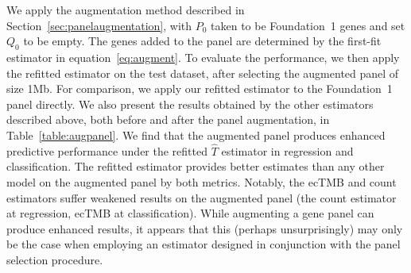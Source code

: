 \documentclass[10pt,twoside,openright]{report}
\begin{document}
We apply the augmentation method described in Section~\ref{sec:panelaugmentation}, with $P_0$ taken to be Foundation~1 genes and set $Q_0$ to be empty.  The genes added to the panel are determined by the first-fit estimator in equation~\eqref{eq:augment}. To evaluate the performance, we then apply the refitted estimator on the test dataset, after selecting the augmented panel of size 1Mb. For comparison, we apply our refitted estimator to the Foundation~1 panel directly. We also present the results obtained by the other estimators described above, both before and after the panel augmentation, in Table~\ref{table:augpanel}. We find that the augmented panel produces enhanced predictive performance under the refitted $\hat{T}$ estimator in regression and classification. The refitted estimator provides better estimates than any other model on the augmented panel by both metrics. Notably, the ecTMB and count estimators suffer weakened results on the augmented panel (the count estimator at regression, ecTMB at classification). While augmenting a gene panel can produce enhanced results, it appears that this (perhaps unsurprisingly) may only be the case when employing an estimator designed in conjunction with the panel selection procedure.



\end{document}
